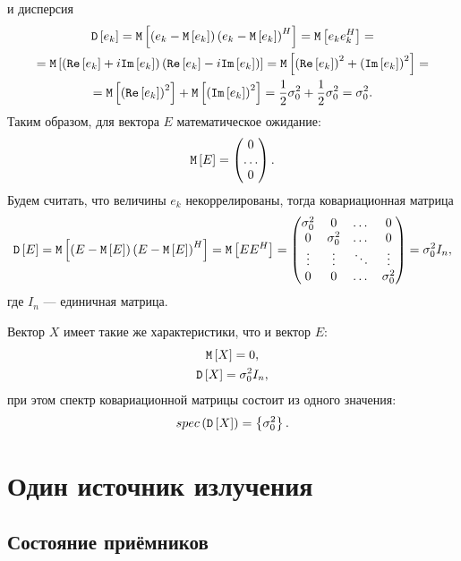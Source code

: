 и дисперсия
\begin{multline*}
    \mathtt{D} \left [ e_k \right ]
    = \mathtt{M} \left [ \left ( e_k - \mathtt{M} \left [ e_k \right ] \right ) \left ( e_k - \mathtt{M} \left [ e_k \right ] \right )^H \right ]
    = \mathtt{M} \left [ e_k e_k^H \right ] = \\
    = \mathtt{M} \left [ \left ( \mathtt{Re} \left [ e_k \right ] + i \mathtt{Im} \left [ e_k \right ] \right ) \left ( \mathtt{Re} \left [ e_k \right ] - i \mathtt{Im} \left [ e_k \right ] \right ) \right ]
    = \mathtt{M} \left [ \left ( \mathtt{Re} \left [ e_k \right ] \right )^2 + \left ( \mathtt{Im} \left [ e_k \right ] \right )^2 \right ] = \\
    = \mathtt{M} \left [ \left ( \mathtt{Re} \left [ e_k \right ] \right )^2 \right ] + \mathtt{M} \left [ \left ( \mathtt{Im} \left [ e_k \right ] \right )^2 \right ]
    = \frac{1}{2} \sigma_0^2 + \frac{1}{2} \sigma_0^2
    = \sigma_0^2 .
\end{multline*}
Таким образом, для вектора $E$ математическое ожидание:
\[
    \mathtt{M} \left [ E \right ]
    = \begin{pmatrix}
          0 \\
          \dots \\
          0
    \end{pmatrix} .
\]
Будем считать, что величины $e_k$ некоррелированы, тогда ковариационная матрица
\[
    \mathtt{D} \left [ E \right ]
    = \mathtt{M} \left [ \left ( E - \mathtt{M} \left [ E \right ] \right ) \left ( E - \mathtt{M} \left [ E \right ] \right )^H \right ]
    = \mathtt{M} \left [ E E^H \right ]
    = \begin{pmatrix}
          \sigma_0^2 & 0          & \dots  & 0          \\
          0          & \sigma_0^2 & \dots  & 0          \\
          \vdots     & \vdots     & \ddots & \vdots     \\
          0          & 0          & \dots  & \sigma_0^2
    \end{pmatrix}
    = \sigma_0^2 I_n ,
\]
где $I_n$ --- единичная матрица.

Вектор $X$ имеет такие же характеристики, что и вектор $E$:
\begin{gather*}
    \mathtt{M} \left [ X \right ] = 0, \\
    \mathtt{D} \left [ X \right ] = \sigma_0^2 I_n ,
\end{gather*}
при этом спектр ковариационной матрицы состоит из одного значения:
\[
    spec \left ( \mathtt{D} \left [ X \right ] \right ) = \left \{ \sigma_0^2 \right \}.
\]


\section{Один источник излучения}

\subsection{Состояние приёмников}

